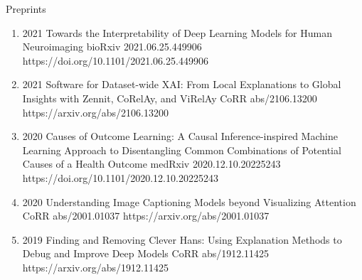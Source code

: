 \documentclass[10pt,a4paper]{article} %
\begin{document}
\headedsection %
{Preprints}{}
{
    \begin{enumerate}

        \item[] 
                            {2021}
                            {Towards the Interpretability of Deep Learning Models for Human Neuroimaging}
                            {bioRxiv 2021.06.25.449906}
                            {https://doi.org/10.1101/2021.06.25.449906}

        \item[] 
                            {2021}
                            {Software for Dataset-wide XAI: From Local Explanations to Global Insights with Zennit, CoRelAy, and ViRelAy}
                            {CoRR abs/2106.13200}
                            {https://arxiv.org/abs/2106.13200}

        \item[] 
                            {2020}
                            {Causes of Outcome Learning: A Causal Inference-inspired Machine Learning Approach to Disentangling Common Combinations of Potential Causes of a Health Outcome}
                            {medRxiv 2020.12.10.20225243}
                            {https://doi.org/10.1101/2020.12.10.20225243}

        \item[] 
                            {2020}
                            {Understanding Image Captioning Models beyond Visualizing Attention}
                            {CoRR abs/2001.01037}
                            {https://arxiv.org/abs/2001.01037}

        \item[] 
                            {2019}
                            {Finding and Removing Clever Hans: Using Explanation Methods to Debug and Improve Deep Models}
                            {CoRR abs/1912.11425}
                            {https://arxiv.org/abs/1912.11425}


\end{enumerate}}
\end{document}
